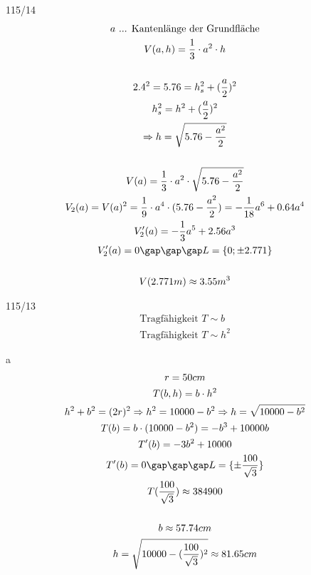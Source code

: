 \begin{exercise}{115/14}
  \begin{gather*}
    a \text{ ... Kantenlänge der Grundfläche} \\
    V(a, h) = \frac{1}{3} \cdot a^2 \cdot h \\\\
    2.4^2 = 5.76 = h_s^2 + (\frac{a}{2})^2 \\
    h_s^2 = h^2 + (\frac{a}{2})^2 \\
    \Rightarrow h = \sqrt{5.76 - \frac{a^2}{2}} \\\\
    V(a) = \frac{1}{3} \cdot a^2 \cdot \sqrt{5.76 - \frac{a^2}{2}} \\
    V_2(a) = V(a)^2 = \frac{1}{9} \cdot a^4 \cdot (5.76 - \frac{a^2}{2}) = -\frac{1}{18}a^6 + 0.64a^4 \\
    V_2'(a) = -\frac{1}{3}a^5 + 2.56a^3 \\
    V_2'(a) = 0 \gap\gap\gap L = \{0; \pm 2.771\} \\\\
    V(2.771m) \approx 3.55m^3
  \end{gather*}
\end{exercise}
\newpage
\begin{exercise}{115/13}
  \begin{gather*}
    \text{Tragfähigkeit } T \sim b \\
    \text{Tragfähigkeit } T \sim h^2
  \end{gather*}
  \item [a]
  \begin{gather*}
    r = 50cm \\
    T(b, h) = b \cdot h^2 \\
    h^2 + b^2 = (2r)^2 \Rightarrow h^2 = 10000 - b^2 \Rightarrow h = \sqrt{10000 - b^2} \\
    T(b) = b \cdot (10000 - b^2) = -b^3 + 10000b \\
    T'(b) = -3b^2 + 10000 \\
    T'(b) = 0 \gap\gap\gap L = \{\pm \frac{100}{\sqrt{3}}\} \\
    T(\frac{100}{\sqrt{3}}) \approx 384900 \\\\
    b \approx 57.74cm \\
    h = \sqrt{10000 - (\frac{100}{\sqrt{3}})^2} \approx 81.65cm
  \end{gather*}
\end{exercise}
